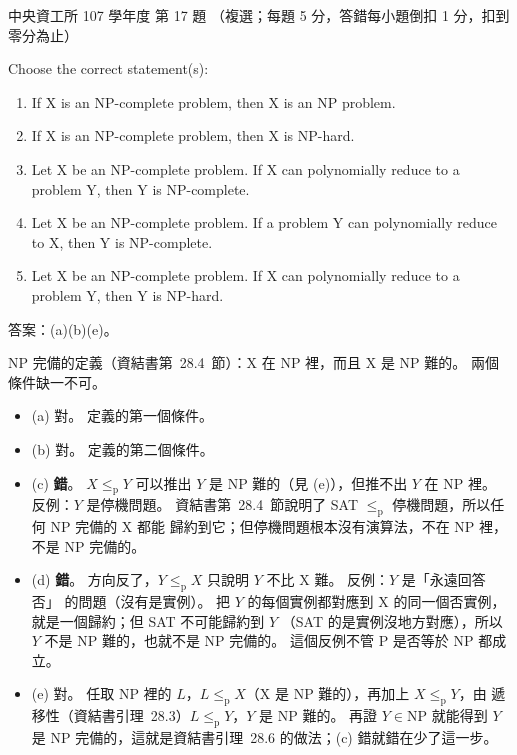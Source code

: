 \begin{pastexam}[label={px:ncu-107-dsa-17}]{中央資工所 107 學年度 第 17 題}
（複選；每題 5 分，答錯每小題倒扣 1 分，扣到零分為止）

Choose the correct statement(s):
\begin{enumerate}[label=(\alph*)]
\item If X is an NP-complete problem, then X is an NP problem.
\item If X is an NP-complete problem, then X is NP-hard.
\item Let X be an NP-complete problem. If X can polynomially reduce to a problem Y, then Y is
NP-complete.
\item Let X be an NP-complete problem. If a problem Y can polynomially reduce to X, then Y is
NP-complete.
\item Let X be an NP-complete problem. If X can polynomially reduce to a problem Y, then Y is
NP-hard.
\end{enumerate}
\end{pastexam}

\begin{pastsoln}
答案：(a)(b)(e)。

NP 完備的定義（資結書第~28.4~節）：X 在 NP 裡，而且 X 是 NP 難的。 兩個條件缺一不可。

\begin{itemize}
\item (a) 對。 定義的第一個條件。
\item (b) 對。 定義的第二個條件。
\item (c) \textbf{錯}。 $X \le_{\mathrm{p}} Y$ 可以推出 $Y$ 是 NP 難的（見 (e)），但推不出 $Y$ 在 NP 裡。
反例：$Y$ 是停機問題。 資結書第~28.4~節說明了 SAT $\le_{\mathrm{p}}$ 停機問題，所以任何 NP 完備的 X 都能
歸約到它；但停機問題根本沒有演算法，不在 NP 裡，不是 NP 完備的。
\item (d) \textbf{錯}。 方向反了，$Y \le_{\mathrm{p}} X$ 只說明 $Y$ 不比 X 難。 反例：$Y$ 是「永遠回答否」
的問題（沒有是實例）。 把 $Y$ 的每個實例都對應到 X 的同一個否實例，就是一個歸約；但 SAT 不可能歸約到 $Y$
（SAT 的是實例沒地方對應），所以 $Y$ 不是 NP 難的，也就不是 NP 完備的。 這個反例不管 P 是否等於 NP 都成立。
\item (e) 對。 任取 NP 裡的 $L$，$L \le_{\mathrm{p}} X$（X 是 NP 難的），再加上 $X \le_{\mathrm{p}} Y$，由
遞移性（資結書引理~28.3）$L \le_{\mathrm{p}} Y$，$Y$ 是 NP 難的。 再證 $Y \in \mathrm{NP}$ 就能得到 $Y$ 是
NP 完備的，這就是資結書引理~28.6 的做法；(c) 錯就錯在少了這一步。
\end{itemize}
\end{pastsoln}
